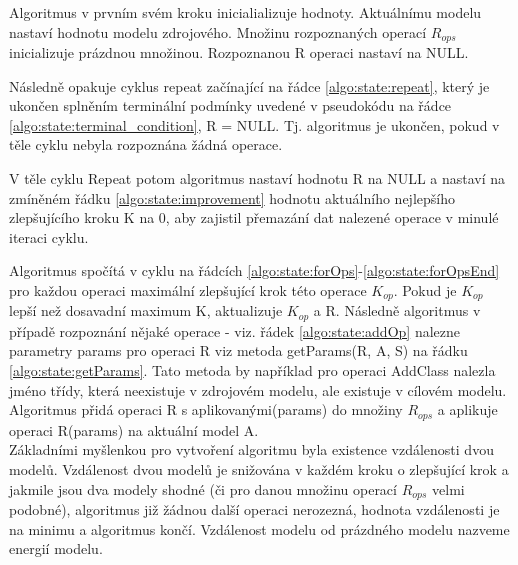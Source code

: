 \documentclass[11pt,twoside,a4paper]{book}
\begin{document}
Algoritmus v prvním svém kroku inicialializuje hodnoty.
Aktuálnímu modelu nastaví hodnotu modelu zdrojového. Množinu rozpoznaných
operací $R_{ops}$ inicializuje prázdnou množinou. Rozpoznanou R operaci nastaví
na NULL.

Následně opakuje cyklus repeat začínající na řádce \ref{algo:state:repeat},
který je ukončen splněním terminální podmínky uvedené v pseudokódu na řádce
\ref{algo:state:terminal_condition}, R = NULL. Tj. algoritmus je ukončen, pokud
v těle cyklu nebyla rozpoznána žádná operace.

V těle cyklu Repeat potom algoritmus nastaví hodnotu R na NULL a nastaví
na zmíněném řádku \ref{algo:state:improvement} hodnotu aktuálního nejlepšího
zlepšujícího kroku K na 0, aby zajistil přemazání dat nalezené operace v minulé
iteraci cyklu.

Algoritmus spočítá v cyklu na řádcích
\ref{algo:state:forOps}-\ref{algo:state:forOpsEnd} pro každou operaci maximální
zlepšující krok této operace $K_{op}$. Pokud je $K_{op}$ lepší než
dosavadní maximum K, aktualizuje $K_{op}$ a R. Následně algoritmus v případě
rozpoznání nějaké operace - viz. řádek \ref{algo:state:addOp} nalezne parametry
params pro operaci R viz metoda getParams(R, A, S) na řádku
\ref{algo:state:getParams}. Tato metoda by například pro operaci AddClass
nalezla jméno třídy, která neexistuje v zdrojovém modelu, ale existuje v cílovém
modelu. Algoritmus přidá operaci R s aplikovanými(params) do množiny $R_{ops}$ a
aplikuje operaci R(params) na aktuální model A.\ \\

Základními myšlenkou pro vytvoření algoritmu byla existence
vzdálenosti dvou modelů. Vzdálenost dvou modelů je snižována v každém
kroku o zlepšující krok a jakmile jsou dva modely shodné (či pro danou množinu
operací $R_{ops}$ velmi podobné), algoritmus již žádnou další operaci
nerozezná, hodnota vzdálenosti je na minimu a algoritmus končí.
Vzdálenost modelu od prázdného modelu nazveme energií modelu.
\end{document}
